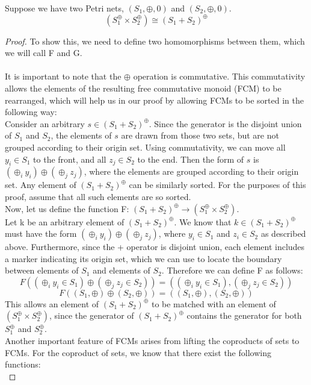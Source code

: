 \begin{lemma}
Suppose we have two Petri nets, $(S_1, \oplus, 0)$ and $(S_2, \oplus, 0)$.\\ 
\[(S_1 ^\oplus \times S_2 ^\oplus) \cong (S_1 + S_2)^\oplus\]
\begin{proof}
To show this, we need to define two homomorphisms between them, which we will call F and G.\\
\bigskip\\
It is important to note that the $\oplus$ operation is commutative. This commutativity allows the elements of the resulting free commutative monoid (FCM) to be rearranged, which will help us in our proof by allowing FCMs to be sorted in the following way:\bigskip\\
Consider an arbitrary $s \in (S_1 + S_2)^\oplus$. Since the generator is the disjoint union of $S_1$ and $S_2$, the elements of $s$ are drawn from those two sets, but are not grouped according to their origin set. Using commutativity, we can move all $y_i \in S_1$ to the front, and all $z_j \in S_2$ to the end. Then the form of $s$ is $(\oplus_i y_i) \oplus (\oplus_j z_j)$, where the elements are grouped according to their origin set. Any element of $(S_1 + S_2)^\oplus$ can be similarly sorted. For the purposes of this proof, assume that all such elements are so sorted.\bigskip \\
Now, let us define the function F: $(S_1 + S_2)^\oplus \to (S_1 ^\oplus \times S_2 ^\oplus)$.\\
Let k be an arbitrary element of $(S_1 + S_2)^\oplus$. We know that $k \in (S_1 + S_2)^\oplus$ must have the form $(\oplus_i y_i) \oplus (\oplus_j z_j)$, where $y_i \in S_1$ and $z_i \in S_2$ as described above. Furthermore, since the + operator is disjoint union, each element includes a marker indicating its origin set, which we can use to locate the boundary between elements of $S_1$ and elements of $S_2$. Therefore we can define F as follows:\\
\[F((\oplus_i y_i \in S_1) \oplus (\oplus_j z_j \in S_2)) = ((\oplus_i y_i \in S_1), (\oplus_j z_j \in S_2))\]
\[F((S_1, \oplus) \oplus (S_2, \oplus)) = ((S_1, \oplus), (S_2, \oplus))\]
This allows an element of $(S_1 + S_2)^\oplus$ to be matched with an element of $(S_1 ^\oplus \times S_2 ^\oplus)$, since the generator of $(S_1 + S_2)^\oplus$ contains the generator for both $S_1^\oplus$ and $S_2^\oplus$.\bigskip\\ 
Another important feature of FCMs arises from lifting the coproducts of sets to FCMs. For the coproduct of sets, we know that there exist the following functions:\\

\end{proof}
\end{lemma}
